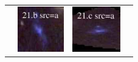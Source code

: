 \documentclass[useAMS,usenatbib]{mn2e}
\begin{document}
\begin{table}
\begin{tabular}{cccc}
    & \multicolumn{1}{m{1.7cm}}{\includegraphics[height=2.00cm,clip]{figs/enfw_img/rgb.pre_21_b_a_tri.ps}}
    & \multicolumn{1}{m{1.7cm}}{\includegraphics[height=2.00cm,clip]{figs/enfw_img/rgb.pre_21_c_a_tri.ps}} \\
  \end{tabular}

\end{table}

\clearpage
\end{document}

